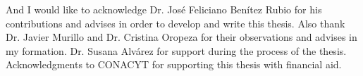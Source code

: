 
\begin{acknowledgements}      

And I would like to acknowledge Dr. Jos\'e Feliciano Ben\'itez Rubio for his contributions and advises in order to develop  and write this thesis. Also thank Dr. Javier Murillo and  Dr. Cristina Oropeza for their observations and advises in my formation. 
Dr. Susana Alv\'arez for support during the process of the thesis. Acknowledgments to CONACYT for supporting this thesis with financial aid. 

\end{acknowledgements}
